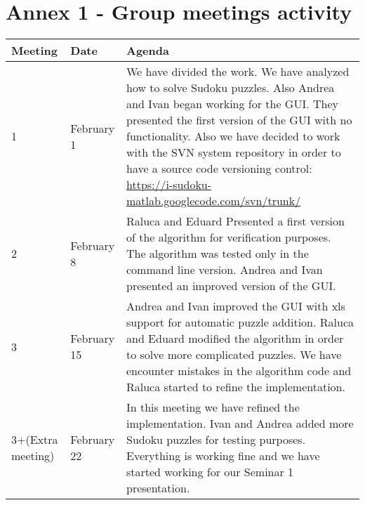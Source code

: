 \documentclass[12pt,a4paper]{article} %
\begin{document}
\section{Annex 1 - Group meetings activity}
\begin{center}
\begin{tabular}{ | l | l | p{8cm} |}
\hline
Meeting & Date & Agenda\\ \hline
1 & February 1 & We have divided the work. We have analyzed how to solve Sudoku puzzles. Also Andrea and Ivan began working for the GUI. They presented the first version of the GUI with no functionality. Also we have decided to work with the SVN system repository in order to have a source code versioning control: \url{https://i-sudoku-matlab.googlecode.com/svn/trunk/} \\ \hline
2 & February 8 & Raluca and Eduard Presented a first version of the algorithm for verification purposes. The algorithm was tested only in the command line version. Andrea and Ivan presented an improved version of the GUI. \\ \hline
3 & February 15 &  Andrea and Ivan improved the GUI with xls support for automatic puzzle addition. Raluca and Eduard  modified the algorithm in order to solve more complicated puzzles. We have encounter mistakes in the algorithm code and Raluca started to refine the implementation.\\ \hline
3+(Extra meeting) & February 22 & In this meeting we have refined the implementation. Ivan and Andrea added more Sudoku puzzles for testing purposes. Everything is working fine and we have started working for our Seminar 1 presentation.\\ \hline
\end{tabular}
\end{center}
\end{document}
